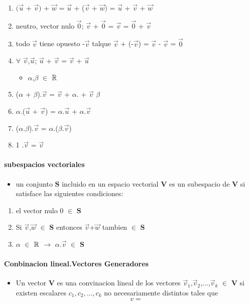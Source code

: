 \documentclass[a4paper]{article}
\begin{document}
\begin{enumerate}
	\item $(\vec{u}$ + $\vec{v})$ + $\vec{w}$  = $\vec{u}$ + ($\vec{v}$ + $\vec{w})$ = $\vec{u}$ + $\vec{v}$ + $\vec{w}$
	\item neutro, vector nulo $\vec{0}$; $\vec{v}$ + $\vec{0}$ = $\vec{v}$ = $\vec{0}$ + $\vec{v}$
	\item todo $\vec{v}$ tiene opuesto -$\vec{v}$ talque  $\vec{v}$ + (-$\vec{v}$) = $\vec{v}$ - $\vec{v}$ = $\vec{0}$
	\item $\forall$ $\vec{v}$,$\vec{u}$;   $\vec{u}$ + $\vec{v}$ = $\vec{v}$ + $\vec{u}$
	\begin{itemize}
		\item $\alpha$,$\beta$ $\in$ $\Bbb{R}$
	\end{itemize}
	\item ($\alpha$ + $\beta$).$\vec{v}$ = $\vec{v}$ + $\alpha$. + $\vec{v}$ $\beta$
	\item $\alpha$.($\vec{u}$ + $\vec{v}$) = $\alpha$.$\vec{u}$ + $\alpha$.$\vec{v}$
	\item ($\alpha$.$\beta$).$\vec{v}$ = $\alpha$.($\beta$.$\vec{v}$)
	\item 1 .$\vec{v}$ = $\vec{v}$	  
\end{enumerate}

\paragraph{subespacios vectoriales}
\begin{itemize}
	\item un conjunto $\textbf{S}$ incluido en un espacio vectorial $\textbf{V}$ es un subespacio de $\textbf{V}$ si satisface las siguientes condiciones:
\end{itemize}
\begin{enumerate}
	\item el vector nulo 0 $\in$ $\textbf{S}$
	\item Si $\vec{v}$,$\vec{w}$ $\in$ $\textbf{S}$ entonces $\vec{v}$+$\vec{w}$ tambien $\in$ $\textbf{S}$
	\item $\alpha$ $\in$ $\Bbb{R}$ $\longrightarrow$ $\alpha$.$\vec{v}$ $\in$ $\textbf{S}$ 
\end{enumerate}

\paragraph{Conbinacion lineal.Vectores Generadores}
\begin{itemize}
	\item Un vector $\textbf{V}$ es una convinacion lineal de los vectores $\vec{v}_1$,$\vec{v}_2$,...,$\vec{v}_k$ $\in$ $\textbf{V}$ si existen escalares $c_1,c_2,...,c_k$ no necesariamente distintos tales que
	\begin{equation}
		v = 
	\end{equation}
\end{itemize}
\end{document}
